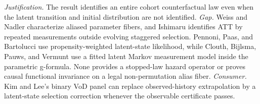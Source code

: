 \documentclass{article}
\begin{document}
\par\smallskip\noindent \textit{Justification.} The result identifies an entire cohort counterfactual law even when the latent transition and initial distribution are not identified. \textit{Gap.} Weiss and Nadler characterize aliased parameter fibers, and Ishimaru identifies ATT by repeated measurements outside evolving staggered selection. Pennoni, Paas, and Bartolucci use propensity-weighted latent-state likelihood, while Clouth, Bijlsma, Pauws, and Vermunt use a fitted latent Markov measurement model inside the parametric g-formula. None provides a stopped-law hazard operator or proves causal functional invariance on a legal non-permutation alias fiber. \textit{Consumer.} Kim and Lee's binary VoD panel can replace observed-history extrapolation by a latent-state selection correction whenever the observable certificate passes.
\end{document}
